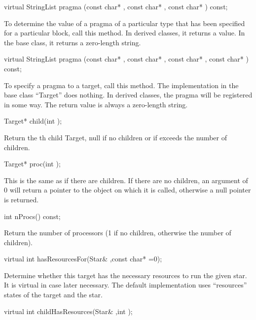 \begin{example}
virtual StringList pragma (const char* ,
	const char* ,
	const char* ) const;
\end{example}

To determine the value of a pragma of a particular type
that has been specified for a particular block, call this
method. In derived classes, it returns a value.
In the base class, it returns a zero-length string.

\begin{example}
virtual StringList pragma (const char* ,
	const char* ,
	const char* ,
	const char* ) const;
\end{example}

To specify a pragma to a target, call this method.
The implementation in the base class ``Target'' does nothing.
In derived classes, the pragma will be registered in some way.
The return value is always a zero-length string.

\begin{example}
Target* child(int );
\end{example}

Return the th child Target, null if no children or if
 exceeds the number of children.

\begin{example}
Target* proc(int );
\end{example}

This is the same as  if there are children.  If
there are no children, an argument of 0 will return a pointer
to the object on which it is called, otherwise a null pointer
is returned.

\begin{example}
int nProcs() const;
\end{example}

Return the number of processors (1 if no children, otherwise the
number of children).

\begin{example}
virtual int hasResourcesFor(Star& ,const char* =0);
\end{example}

Determine whether this target has the necessary resources to run the
given star.  It is virtual in case later necessary.  The default implementation
uses ``resources'' states of the target and the star.

\begin{example}
virtual int childHasResources(Star& ,int );
\end{example}

